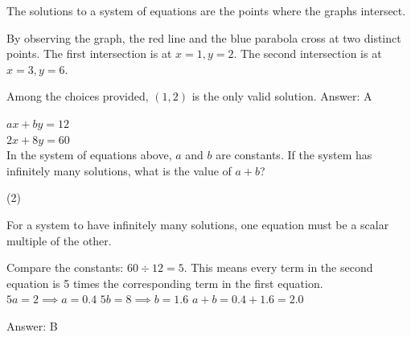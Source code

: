 \documentclass[11pt,paper=a4,answers]{exam}
\begin{document}
\begin{questions}
\begin{solution}
The solutions to a system of equations are the points where the graphs intersect.
\vspace{5pt}
\begin{center}
By observing the graph, the red line and the blue parabola cross at two distinct points.
\vspace{5pt}
The first intersection is at $x=1, y=2$.
\vspace{5pt}
The second intersection is at $x=3, y=6$.
\end{center}
\vspace{5pt}
Among the choices provided, $(1, 2)$ is the only valid solution.
\vspace{5pt}
Answer: \colorbox{yellow!100}{A}
\end{solution}

\vspace{1cm}

\question
$ax + by = 12$ \\
$2x + 8y = 60$ \\
In the system of equations above, $a$ and $b$ are constants. If the system has infinitely many solutions, what is the value of $a + b$?
\begin{tasks}(2)
   
\end{tasks}

\begin{solution}
For a system to have infinitely many solutions, one equation must be a scalar multiple of the other.
\vspace{5pt}
\begin{center}
Compare the constants: $60 \div 12 = 5$.
\vspace{5pt}
This means every term in the second equation is 5 times the corresponding term in the first equation.
\vspace{5pt}
$5a = 2 \implies a = 0.4$
\vspace{5pt}
$5b = 8 \implies b = 1.6$
\vspace{5pt}
$a + b = 0.4 + 1.6 = 2.0$
\end{center}
\vspace{5pt}
Answer: \colorbox{yellow!100}{B}
\end{solution}

\vspace{1cm}


\end{questions}
\end{document}
